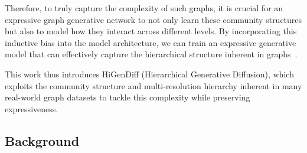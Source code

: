 Therefore, to truly capture the complexity of such graphs, it is crucial for an expressive graph generative network to not only learn these community structures but also to model how they interact across different levels. By incorporating this inductive bias into the model architecture, we can train an expressive generative model that can effectively capture the hierarchical structure inherent in graphs~\cite{karami_multi-resolution_2024}. 

This work thus introduces HiGenDiff (Hierarchical Generative Diffusion), which exploits the community structure and multi-resolution hierarchy inherent in many real-world graph datasets to tackle this complexity while preserving expressiveness.

\subsection{Background}

